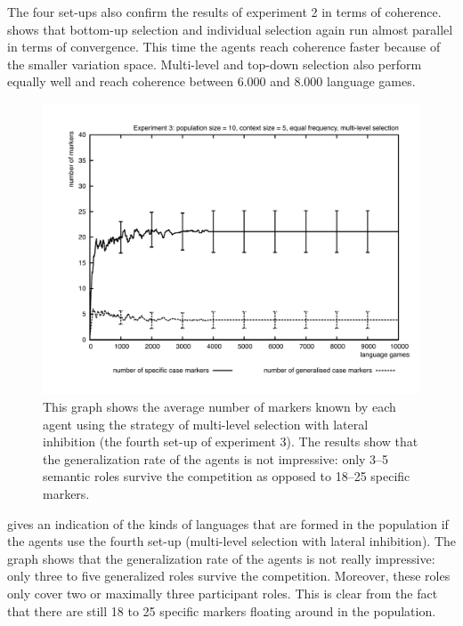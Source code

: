 The four set-ups also confirm the results of experiment 2 in terms of coherence.  shows that bottom-up selection and individual selection again run almost parallel in terms of convergence. This time the agents reach coherence faster because of the smaller variation space. Multi-level and top-down selection also perform equally well and reach coherence between 6.000 and 8.000 language games.

\begin{figure}[b]
\centerline{\includegraphics[width=\textwidth]{Chapter4/figs/markers3}}
  \caption[Experiment 3: number of markers]{This graph shows the average number of markers known by each agent using the strategy of multi-level selection with lateral inhibition (the fourth set-up of experiment 3). The results show that the generalization rate of the agents is not impressive: only 3--5 semantic roles survive the competition as opposed to 18--25 specific markers.}
   \label{f:markers3}
\end{figure}

 gives an indication of the kinds of languages that are formed in the population if the agents use the fourth set-up (multi-level selection with lateral inhibition). The graph shows that the generalization rate of the agents is not really impressive: only three to five generalized roles survive the competition. Moreover, these roles only cover two or maximally three participant roles. This is clear from the fact that there are still 18 to 25 specific markers floating around in the population.

